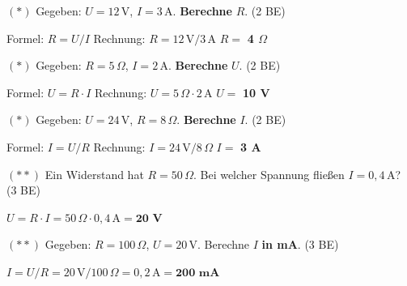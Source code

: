 \documentclass[11pt, a4paper]{article}
\newcommand{\loes}[1]{\textcolor{loesung}{\textbf{#1}}}
\newcommand{\operator}[1]{\textbf{#1}}
\begin{document}
\begin{teil}
    \item $(*)$ Gegeben: $U = 12\,\text{V}$, $I = 3\,\text{A}$. \operator{Berechne} $R$. \hfill (2 BE)

    \vspace{0.3em}
    Formel: \loes{$R = U/I$} \hspace{0.5cm} Rechnung: \loes{$R = 12\,\text{V} / 3\,\text{A}$} \hspace{0.5cm} $R = $ \loes{4 $\Omega$}

    \vspace{0.6em}
    \item $(*)$ Gegeben: $R = 5\,\Omega$, $I = 2\,\text{A}$. \operator{Berechne} $U$. \hfill (2 BE)

    \vspace{0.3em}
    Formel: \loes{$U = R \cdot I$} \hspace{0.5cm} Rechnung: \loes{$U = 5\,\Omega \cdot 2\,\text{A}$} \hspace{0.5cm} $U = $ \loes{10 V}

    \vspace{0.6em}
    \item $(*)$ Gegeben: $U = 24\,\text{V}$, $R = 8\,\Omega$. \operator{Berechne} $I$. \hfill (2 BE)

    \vspace{0.3em}
    Formel: \loes{$I = U/R$} \hspace{0.5cm} Rechnung: \loes{$I = 24\,\text{V} / 8\,\Omega$} \hspace{0.5cm} $I = $ \loes{3 A}

    \vspace{0.6em}
    \item $(**)$ Ein Widerstand hat $R = 50\,\Omega$. Bei welcher Spannung fließen $I = 0{,}4\,\text{A}$? \hfill (3 BE)

    \textcolor{loesung}{$U = R \cdot I = 50\,\Omega \cdot 0{,}4\,\text{A} = \textbf{20 V}$}

    \vspace{0.5em}
    \item $(**)$ Gegeben: $R = 100\,\Omega$, $U = 20\,\text{V}$. Berechne $I$ \textbf{in mA}. \hfill (3 BE)

    \textcolor{loesung}{$I = U / R = 20\,\text{V} / 100\,\Omega = 0{,}2\,\text{A} = \textbf{200 mA}$}
\end{teil}

\end{document}
